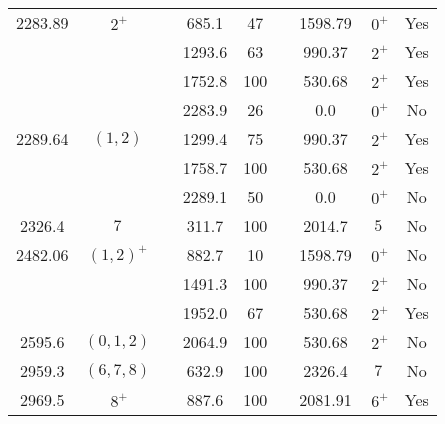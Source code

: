 \begin{tabular}{ccccccccc}
2283.89   & $~2^+$    &            &  685.1     &  47        &                  & 1598.79         & $~0^+$         & Yes               \\
          &           &            & 1293.6     &  63        &                  &  990.37         & $~2^+$         & Yes               \\
          &           &            & 1752.8     & 100        &                  &  530.68         & $~2^+$         & Yes               \\
          &           &            & 2283.9     &  26        &                  &    0.0          & $~0^+$         & No                \\
2289.64   & $(1,2)$   &            & 1299.4     &  75        &                  &  990.37         & $~2^+$         & Yes               \\
          &           &            & 1758.7     & 100        &                  &  530.68         & $~2^+$         & Yes               \\
          &           &            & 2289.1     &  50        &                  &    0.0          & $~0^+$         & No                \\
2326.4    & $7$       &            &  311.7     & 100        &                  & 2014.7          & $5$            & No                \\
2482.06   & $(1,2)^+$ &            &  882.7     &  10        &                  & 1598.79         & $~0^+$         & No                \\
          &           &            & 1491.3     & 100        &                  &  990.37         & $~2^+$         & No                \\
          &           &            & 1952.0     &  67        &                  &  530.68         & $~2^+$         & Yes               \\
2595.6    & $(0,1,2)$ &            & 2064.9     & 100        &                  &  530.68         & $~2^+$         & No                \\
2959.3    & $(6,7,8)$ &            &  632.9     & 100        &                  &  2326.4         & $7$            & No                \\
2969.5    & $~8^+$    &            &  887.6     & 100        &                  &  2081.91        & $~6^+$         & Yes               \\
\hline
\end{tabular}